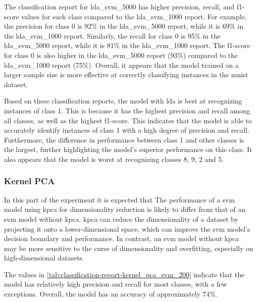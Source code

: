 

The classification report for lda\_svm\_5000 has higher precision, recall, and f1-score values for each class compared to the lda\_svm\_1000 report. For example, the precision for class 0 is 92\% in the lda\_svm\_5000 report, while it is 69\% in the lda\_svm\_1000 report. Similarly, the recall for class 0 is 95\% in the lda\_svm\_5000 report, while it is 81\% in the lda\_svm\_1000 report. The f1-score for class 0 is also higher in the lda\_svm\_5000 report (93\%) compared to the lda\_svm\_1000 report (75\%). Overall, it appears that the model trained on a larger sample size is more effective at correctly classifying instances in the \gls{mnist} dataset.

Based on these classification reports, the model with \gls{lda} is best at recognizing instances of class 1. This is because it has the highest precision and recall among all classes, as well as the highest f1-score. This indicates that the model is able to accurately identify instances of class 1 with a high degree of precision and recall. Furthermore, the difference in performance between class 1 and other classes is the largest, further highlighting the model's superior performance on this class. It also appears that the model is worst at recognizing classes 8, 9, 2 and 5.

\subsubsection{Kernel PCA}\label{subsubsec:experiment_4_kernel_pca}
In this part of the experiment it is expected that The performance of a \gls{svm} model using  \gls{kpca} for dimensionality reduction is likely to differ from that of an \gls{svm} model without \gls{kpca}. \gls{kpca} can reduce the dimensionality of a dataset by projecting it onto a lower-dimensional space, which can improve the \gls{svm} model's decision boundary and performance. In contrast, an \gls{svm} model without \gls{kpca} may be more sensitive to the curse of dimensionality and overfitting, especially on high-dimensional datasets.




The values in \autoref{tab:classification-report-kernel_pca_svm_200} indicate that the model has relatively high precision and recall for most classes, with a few exceptions. Overall, the model has an accuracy of approximately 74\%.

